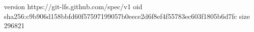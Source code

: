 version https://git-lfs.github.com/spec/v1
oid sha256:c9b906d158bbfd60f57597199057b0eece2d6f8ef4f55783ec603f1805b6d7fc
size 296821
